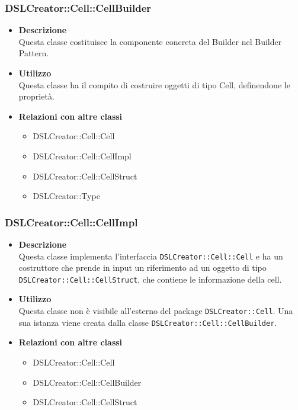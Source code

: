  \subsubsection{DSLCreator::Cell::CellBuilder}
                    \begin{itemize}
                        \item \textbf{Descrizione} \hfill \\
                            Questa classe costituisce la componente concreta del Builder nel Builder Pattern.
                        \item \textbf{Utilizzo} \hfill \\
                            Questa classe ha il compito di costruire oggetti di tipo Cell, definendone le proprietà.
                        \item \textbf{Relazioni con altre classi}
                            \begin{itemize}
                              \item DSLCreator::Cell::Cell
                              \item DSLCreator::Cell::CellImpl
                              \item DSLCreator::Cell::CellStruct
                              \item DSLCreator::Type
                            \end{itemize}
                    \end{itemize}

 \subsubsection{DSLCreator::Cell::CellImpl}
                    \begin{itemize}
                        \item \textbf{Descrizione} \hfill \\
                            Questa classe implementa l'interfaccia \texttt{DSLCreator::Cell::Cell} e ha un costruttore che prende in input un riferimento ad un oggetto di tipo \texttt{DSLCreator::Cell::CellStruct}, che contiene le informazione della cell.
                        \item \textbf{Utilizzo} \hfill \\
                            Questa classe non è visibile all'esterno del package \texttt{DSLCreator::Cell}. Una sua istanza viene creata dalla classe \texttt{DSLCreator::Cell::CellBuilder}.
                        \item \textbf{Relazioni con altre classi}
                            \begin{itemize}
                              \item DSLCreator::Cell::Cell
                              \item DSLCreator::Cell::CellBuilder
                              \item DSLCreator::Cell::CellStruct
                            \end{itemize}
                    \end{itemize}

